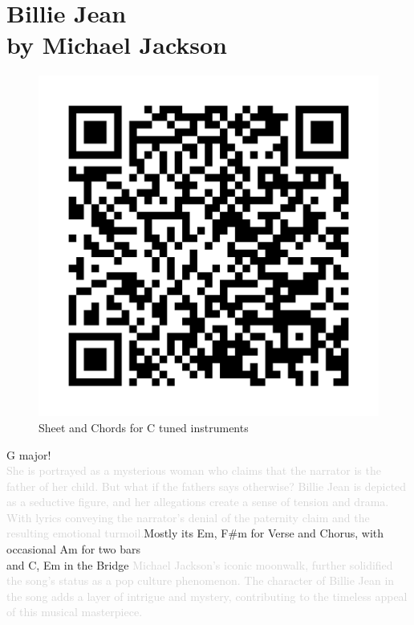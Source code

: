 \chapter[Billie Jean]{Billie Jean\\[1ex]\large{by Michael Jackson}}

\begin{figure}
\includegraphics[width=1\linewidth]{QR_Codes/QR_BillieJean_C.png}\\
Sheet and Chords for C tuned instruments
\end{figure}

G major! \\
\textcolor{lightgray}{She is portrayed as a mysterious woman who claims that the narrator is the father of her child. But what if the fathers says otherwise? Billie Jean is depicted as a seductive figure, and her allegations create a sense of tension and drama. With lyrics conveying the narrator's denial of the paternity claim and the resulting emotional turmoil.}Mostly its Em, F$\#$m for Verse and Chorus, with occasional Am for two bars\\
and C, Em in the Bridge \textcolor{lightgray}{Michael Jackson's iconic moonwalk, further solidified the song's status as a pop culture phenomenon. The character of Billie Jean in the song adds a layer of intrigue and mystery, contributing to the timeless appeal of this musical masterpiece.}\\


